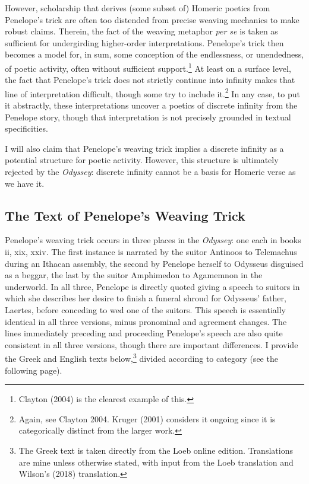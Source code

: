 \documentclass[12pt]{article}
\begin{document}
However, scholarship that derives (some subset of) Homeric poetics from Penelope's trick are often too distended from precise weaving mechanics to make robust claims. Therein, the fact of the weaving metaphor \textit{per se} is taken as sufficient for undergirding higher-order interpretations. Penelope's trick then becomes a model for, in sum, some conception of the endlessness, or unendedness, of poetic activity, often without sufficient support.\footnote{ Clayton (2004) is the clearest example of this.} At least on a surface level, the fact that Penelope's trick does not strictly continue into infinity makes that line of interpretation difficult, though some try to include it.\footnote{ Again, see Clayton 2004. Kruger (2001) considers it ongoing since it is categorically distinct from the larger work.} In any case, to put it abstractly, these interpretations uncover a poetics of discrete infinity from the Penelope story, though that interpretation is not precisely grounded in textual specificities.

I will also claim that Penelope's weaving trick implies a discrete infinity as a potential structure for poetic activity. However, this structure is ultimately rejected by the \textit{Odyssey}: discrete infinity cannot be a basis for Homeric verse as we have it.

\subsection{ The Text of Penelope's Weaving Trick}

Penelope's weaving trick occurs in three places in the \textit{Odyssey}: one each in books ii, xix, xxiv. The first instance is narrated by the suitor Antinoos to Telemachus during an Ithacan assembly, the second by Penelope herself to Odysseus disguised as a beggar, the last by the suitor Amphimedon to Agamemnon in the underworld. In all three, Penelope is directly quoted giving a speech to suitors in which she describes her desire to finish a funeral shroud for Odysseus' father, Laertes, before conceding to wed one of the suitors. This speech is essentially identical in all three versions, minus pronominal and agreement changes. The lines immediately preceding and proceeding Penelope's speech are also quite consistent in all three versions, though there are important differences. I provide the Greek and English texts below,\footnote{ The Greek text is taken directly from the Loeb online edition. Translations are mine unless otherwise stated, with input from the Loeb translation and Wilson's (2018) translation.} divided according to category (see the following page).
\end{document}
